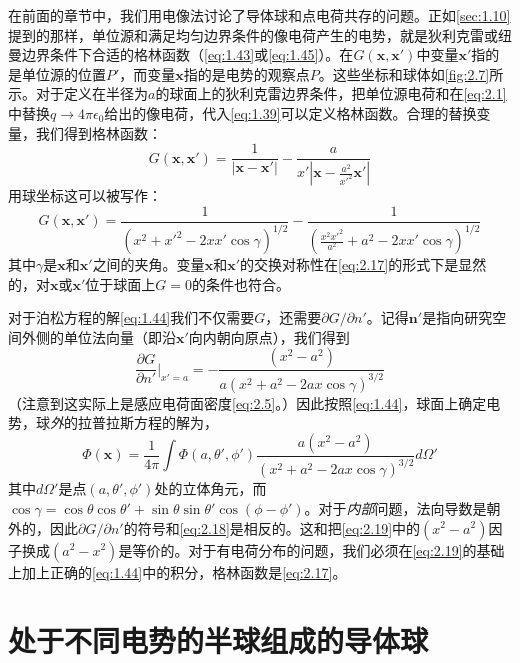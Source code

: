 \documentclass[12pt]{book}
\numberwithin{equation}{chapter}
\numberwithin{figure}{chapter}
\numberwithin{footnote}{page}
\begin{document}
在前面的章节中，我们用电像法讨论了导体球和点电荷共存的问题。正如\autoref{sec:1.10}提到的那样，单位源和满足均匀边界条件的像电荷产生的电势，就是狄利克雷或纽曼边界条件下合适的格林函数（\autoref{eq:1.43}或\autoref{eq:1.45}）。在$G(\mathbf{x},\mathbf{x'})$中变量$\mathbf{x'}$指的是单位源的位置$P'$，而变量$\mathbf{x}$指的是电势的观察点$P$。这些坐标和球体如\autoref{fig:2.7}所示。对于定义在半径为$a$的球面上的狄利克雷边界条件，把单位源电荷和在\autoref{eq:2.1}中替换$q\to 4\pi\epsilon_0$给出的像电荷，代入\autoref{eq:1.39}可以定义格林函数。合理的替换变量，我们得到格林函数：
\begin{equation}\label{eq:2.16}
    G(\mathbf{x},\mathbf{x'})=\frac{1}{|\mathbf{x}-\mathbf{x'}|}-\frac{a}{x'|\mathbf{x}-\frac{a^2}{x'^2}\mathbf{x'}|}
\end{equation}
用球坐标这可以被写作：
\begin{equation}\label{eq:2.17}
    G(\mathbf{x},\mathbf{x'})=\frac{1}{(x^2+x'^2-2xx'\cos\gamma)^{1/2}}-\frac{1}{(\frac{x^2x'^2}{a^2}+a^2-2xx'\cos\gamma)^{1/2}}
\end{equation}
其中$\gamma$是$\mathbf{x}$和$\mathbf{x'}$之间的夹角。变量$\mathbf{x}$和$\mathbf{x'}$的交换对称性在\autoref{eq:2.17}的形式下是显然的，对$\mathbf{x}$或$\mathbf{x'}$位于球面上$G=0$的条件也符合。

对于泊松方程的解\autoref{eq:1.44}我们不仅需要$G$，还需要$\partial G/\partial n'$。记得$\mathbf{n'}$是指向研究空间外侧的单位法向量（即沿$\mathbf{x'}$向内朝向原点），我们得到
\begin{equation}\label{eq:2.18}
    \frac{\partial G}{\partial n'}|_{x'=a}=-\frac{(x^2-a^2)}{a(x^2+a^2-2ax\cos\gamma)^{3/2}}
\end{equation}
（注意到这实际上是感应电荷面密度\autoref{eq:2.5}。）因此按照\autoref{eq:1.44}，球面上确定电势，球\textit{外}的拉普拉斯方程的解为，
\begin{equation}\label{eq:2.19}
    \Phi(\mathbf{x})=\frac{1}{4\pi}\int \Phi(a,\theta',\phi')\frac{a(x^2-a^2)}{(x^2+a^2-2ax\cos\gamma)^{3/2}} d\Omega'
\end{equation}
其中$d\Omega'$是点$(a,\theta',\phi')$处的立体角元，而$\cos\gamma=\cos\theta\cos\theta'+\sin\theta\sin\theta'\cos(\phi-\phi')$。对于\textit{内部}问题，法向导数是朝外的，因此$\partial G/\partial n'$的符号和\autoref{eq:2.18}是相反的。这和把\autoref{eq:2.19}中的$(x^2-a^2)$因子换成$(a^2-x^2)$是等价的。对于有电荷分布的问题，我们必须在\autoref{eq:2.19}的基础上加上正确的\autoref{eq:1.44}中的积分，格林函数是\autoref{eq:2.17}。

\section{处于不同电势的半球组成的导体球}\label{sec:2.7}
\end{document}
